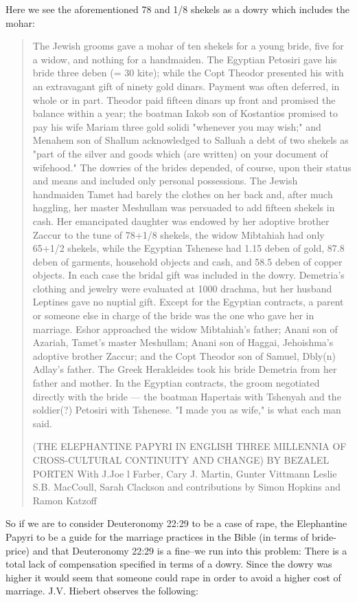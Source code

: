 \documentclass[11pt]{article}
\begin{document}
Here we see the aforementioned 78 and 1/8 shekels as a dowry which includes the mohar:
\begin{quote} 
The Jewish grooms gave a mohar of ten shekels for a young bride, five for a widow, and nothing for a handmaiden. The Egyptian Petosiri gave his bride three deben (= 30 kite); while the Copt Theodor presented his with an extravagant gift of ninety gold dinars. Payment was often deferred, in whole or in part. Theodor paid fifteen dinars up front and promised the balance within a year; the boatman Iakob son of Kostantios promised to pay his wife Mariam three gold solidi "whenever you may wish;" and Menahem son of Shallum acknowledged to Salluah a debt of two shekels as "part of the silver and goods which (are written) on your document of wifehood."  The dowries of the brides depended, of course, upon their status and means and included only personal possessions. The Jewish handmaiden Tamet had barely the clothes on her back and, after much haggling, her master Meshullam was persuaded to add fifteen shekels in cash. Her emancipated daughter was endowed by her adoptive brother Zaccur to the tune of 78+1/8 shekels, the widow Mibtahiah had only 65+1/2 shekels, while the Egyptian Tshenese had 1.15 deben of gold, 87.8 deben of garments, household objects and cash, and 58.5 deben of copper objects. In each case the bridal gift was included in the dowry. Demetria's clothing and jewelry were evaluated at 1000 drachma, but her husband Leptines gave no nuptial gift. Except for the Egyptian contracts, a parent or someone else in charge of the bride was the one who gave her in marriage. Eshor approached the widow Mibtahiah's father; Anani son of Azariah, Tamet's master Meshullam; Anani son of Haggai, Jehoishma's adoptive brother Zaccur; and the Copt Theodor son of Samuel, Dbly(n) Adlay's father. The Greek Herakleides took his bride Demetria from her father and mother. In the Egyptian contracts, the groom negotiated directly with the bride — the boatman Hapertais with Tshenyah and the soldier(?) Petosiri with Tshenese. "I made you as wife," is what each man said.  

(THE ELEPHANTINE PAPYRI IN ENGLISH
THREE MILLENNIA OF CROSS-CULTURAL
CONTINUITY AND CHANGE)
BY
BEZALEL PORTEN
With
J.Joe l Farber, Cary J. Martin, Gunter Vittmann
Leslie S.B. MacCoull, Sarah Clackson
and contributions by
Simon Hopkins and Ramon Katzoff
\end{quote}


So if we are to consider Deuteronomy 22:29 to be a case of rape, the Elephantine Papyri to be a guide for the marriage practices in the Bible (in terms of bride-price) and that Deuteronomy 22:29 is a fine--we run into this problem:
 There is a total lack of compensation specified in terms of a dowry. Since the dowry was higher it would seem that someone could rape in order to avoid a higher cost of marriage. J.V. Hiebert observes the following:
\end{document}
